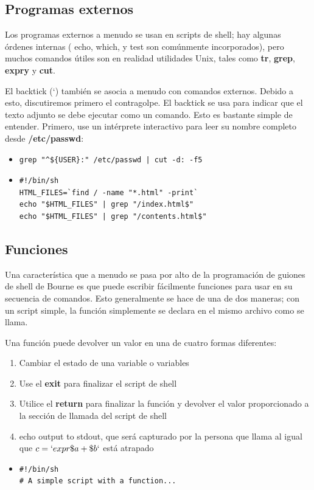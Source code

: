 \documentclass[12pt,letterpaper]{article}
\begin{document}
{        \subsection{Programas externos}
        Los programas externos a menudo se usan en scripts de shell; hay algunas órdenes internas ( echo, which, y test son comúnmente incorporados), pero muchos comandos útiles son en realidad utilidades Unix, tales como \textbf{tr}, \textbf{grep}, \textbf{expry} y \textbf{cut}.\par

El backtick (`) también se asocia a menudo con comandos externos. Debido a esto, discutiremos primero el contragolpe. 
El backtick se usa para indicar que el texto adjunto se debe ejecutar como un comando. Esto es bastante simple de entender. Primero, use un intérprete interactivo para leer su nombre completo desde \textbf{/etc/passwd}:
		\color{red}
        \begin{itemize}
        \item \begin{verbatim}
grep "^${USER}:" /etc/passwd | cut -d: -f5
        \end{verbatim}
        \item \begin{verbatim}
#!/bin/sh
HTML_FILES=`find / -name "*.html" -print`
echo "$HTML_FILES" | grep "/index.html$"
echo "$HTML_FILES" | grep "/contents.html$"
        \end{verbatim}
        \end{itemize}
        \color{black}
        \subsection{Funciones}
        Una característica que a menudo se pasa por alto de la programación de guiones de shell de Bourne es que puede escribir fácilmente funciones para usar en su secuencia de comandos. Esto generalmente se hace de una de dos maneras; con un script simple, la función simplemente se declara en el mismo archivo como se llama.\par 
        Una función puede devolver un valor en una de cuatro formas diferentes:
        \begin{enumerate}
        \item Cambiar el estado de una variable o variables
		\item Use el \textbf{exit} para finalizar el script de shell
		\item Utilice el \textbf{return} para finalizar la función y devolver el valor proporcionado a la sección de llamada del script de shell
		\item echo output to stdout, que será capturado por la persona que llama al igual que $c = `expr \$ a + \$ b`$ está atrapado
		\end{enumerate}
        \color{red}
        \begin{itemize}
        \item \begin{verbatim}
#!/bin/sh
# A simple script with a function...


\end{verbatim}
\end{itemize}}
\end{document}
